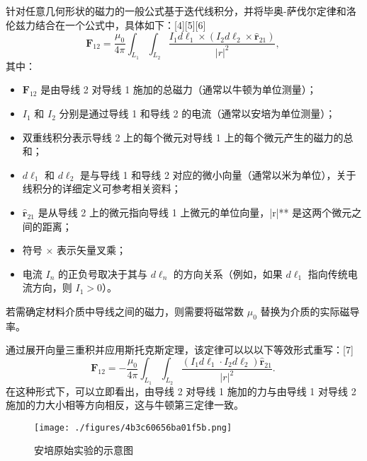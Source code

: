 针对任意几何形状的磁力的一般公式基于迭代线积分，并将毕奥-萨伐尔定律和洛伦兹力结合在一个公式中，具体如下：[4][5][6]
\[
\mathbf{F}_{12} = \frac{\mu_0}{4\pi} \int_{L_1} \int_{L_2} \frac{I_1 d\boldsymbol{\ell}_1 \times \left( I_2 d\boldsymbol{\ell}_2 \times \hat{\mathbf{r}}_{21} \right)}{|r|^2},~
\]
其中：
\begin{itemize}
\item \( \mathbf{F}_{12} \) 是由导线 2 对导线 1 施加的总磁力（通常以牛顿为单位测量）；
\item \( I_1 \) 和 \( I_2 \) 分别是通过导线 1 和导线 2 的电流（通常以安培为单位测量）；
\item 双重线积分表示导线 2 上的每个微元对导线 1 上的每个微元产生的磁力的总和；
\item \( d\boldsymbol{\ell}_1 \) 和 \( d\boldsymbol{\ell}_2 \) 是与导线 1 和导线 2 对应的微小向量（通常以米为单位），关于线积分的详细定义可参考相关资料；
\item \( \hat{\mathbf{r}}_{21} \) 是从导线 2 上的微元指向导线 1 上微元的单位向量，|r|** 是这两个微元之间的距离；
\item 符号 × 表示矢量叉乘；
\item 电流 \( I_n \) 的正负号取决于其与 \( d\boldsymbol{\ell}_n \) 的方向关系（例如，如果 \( d\boldsymbol{\ell}_1 \) 指向传统电流方向，则 \( I_1 > 0 \)）。
\end{itemize}

若需确定材料介质中导线之间的磁力，则需要将磁常数 \( \mu_0 \) 替换为介质的实际磁导率。

通过展开向量三重积并应用斯托克斯定理，该定律可以以以下等效形式重写：[7]
\[
\mathbf{F}_{12} = -\frac{\mu_0}{4\pi} \int_{L_1} \int_{L_2} \frac{\left( I_1 d\boldsymbol{\ell}_1 \cdot I_2 d\boldsymbol{\ell}_2 \right) \hat{\mathbf{r}}_{21}}{|r|^2}.~
\]
在这种形式下，可以立即看出，由导线 2 对导线 1 施加的力与由导线 1 对导线 2 施加的力大小相等方向相反，这与牛顿第三定律一致。

\begin{figure}[ht]
\centering
\texttt{[image: ./figures/4b3c60656ba01f5b.png]}
\caption{安培原始实验的示意图} \label{fig_APDL_1}
\end{figure}

